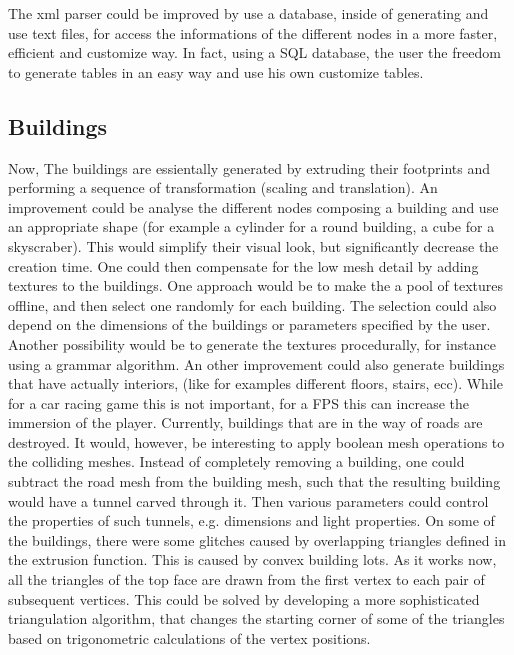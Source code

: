 \documentclass[conference]{IEEEtran}
\begin{document}
The xml parser could be improved by use a database, inside of generating and use text files, for access the informations of the different nodes in a more faster, efficient and customize way. In fact, using a SQL database, the user the freedom to generate tables in an easy way and use his own customize tables.

\subsection{Buildings}
Now, The buildings are essientally generated by extruding their footprints and performing a sequence of transformation (scaling and translation). An improvement could be analyse the different nodes composing a building and use an appropriate shape (for example a cylinder for a round building, a cube for a skyscraber). This would simplify their visual look, but significantly decrease the creation time. One could then compensate for the low mesh detail by adding textures to the buildings. One approach would be to make the a pool of textures offline, and then select one randomly for each building. The selection could also depend on the dimensions of the buildings or parameters specified by the user. Another possibility would be to generate the textures procedurally, for instance using a grammar algorithm. An other improvement could also generate buildings that have actually interiors, (like for examples different floors, stairs, ecc). While for a car racing game this is not important, for a FPS this can increase the immersion of the player. \newline\newline
Currently, buildings that are in the way of roads are destroyed. It would, however, be interesting to apply boolean mesh operations to the colliding meshes. Instead of completely removing a building, one could subtract the road mesh from the building mesh, such that the resulting building would have a tunnel carved through it. Then various parameters could control the properties of such tunnels, e.g. dimensions and light properties.\newline\newline
 On some of the buildings, there were some glitches caused by overlapping triangles defined in the extrusion function. This is caused by convex building lots. As it works now, all the triangles of the top face are drawn from the first vertex to each pair of subsequent vertices. This could be solved by developing a more sophisticated triangulation algorithm, that changes the starting corner of some of the triangles based on trigonometric calculations of the vertex positions. 
\end{document}
